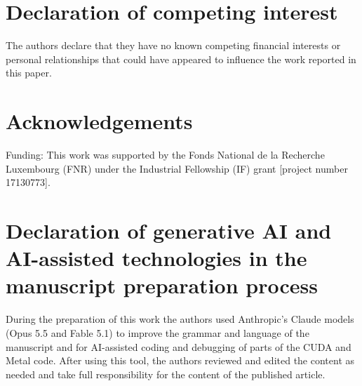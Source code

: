 \documentclass[preprint,12pt,authoryear]{elsarticle}
\begin{document}
\section*{Declaration of competing interest}
The authors declare that they have no known competing financial interests or
personal relationships that could have appeared to influence the work reported
in this paper.

\section*{Acknowledgements}
Funding: This work was supported by the Fonds National de la Recherche
Luxembourg (FNR) under the Industrial Fellowship (IF) grant [project number
17130773].

\section*{Declaration of generative AI and AI-assisted technologies in the manuscript preparation process}
During the preparation of this work the authors used Anthropic's Claude
models (Opus 5.5 and Fable 5.1) to improve the grammar and language of the
manuscript and for AI-assisted coding and debugging of parts of the CUDA and Metal
code. After using this tool, the authors reviewed and edited the content as
needed and take full responsibility for the content of the published article.



\end{document}
